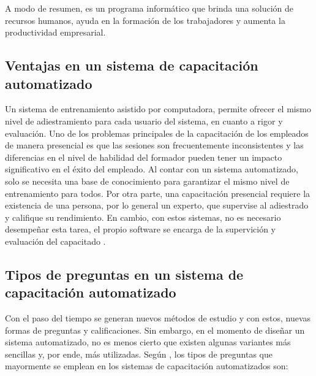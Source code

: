 A modo de resumen, es un programa informático que brinda una solución de recursos humanos, ayuda en la formación de los trabajadores y aumenta la productividad empresarial.

\subsection{Ventajas en un sistema de capacitación automatizado}
Un sistema de entrenamiento asistido por computadora, permite ofrecer el mismo nivel de adiestramiento para cada usuario del sistema, en cuanto a rigor y evaluación. Uno de los problemas principales de la capacitación de los empleados de manera presencial es que las sesiones son frecuentemente inconsistentes y las diferencias en el nivel de habilidad del formador pueden tener un impacto significativo en el éxito del empleado. Al contar con un sistema automatizado, solo se necesita una base de conocimiento para garantizar el mismo nivel de entrenamiento para todos. Por otra parte, una capacitación presencial requiere la existencia de una persona, por lo general un experto, que supervise al adiestrado y califique su rendimiento. En cambio, con estos sistemas, no es necesario desempeñar esta tarea, el propio software se encarga de la supervición y evaluación del capacitado \cite{Kanev2017}.

\subsection{Tipos de preguntas en un sistema de capacitación automatizado}
Con el paso del tiempo se generan nuevos métodos de estudio y con estos, nuevas formas de preguntas y calificaciones. Sin embargo, en el momento de diseñar un sistema automatizado, no es menos cierto que existen algunas variantes más sencillas y, por ende, más utilizadas. Según \cite{Laguna2016}, los tipos de preguntas que mayormente se emplean en los sistemas de capacitación automatizados son:

